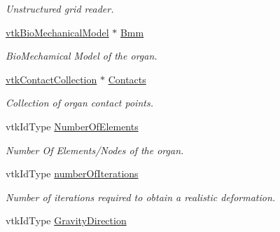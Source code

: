 \begin{DoxyCompactItemize}
\begin{DoxyCompactList}\small\item\em Unstructured grid reader. \item\end{DoxyCompactList}\item 
\hypertarget{classvtkOrgan_addaff1a7cdd0ab90c4a5de3ae53def26}{
\hyperlink{classvtkBioMechanicalModel}{vtkBioMechanicalModel} $\ast$ \hyperlink{classvtkOrgan_addaff1a7cdd0ab90c4a5de3ae53def26}{Bmm}}
\label{classvtkOrgan_addaff1a7cdd0ab90c4a5de3ae53def26}

\begin{DoxyCompactList}\small\item\em BioMechamical Model of the organ. \item\end{DoxyCompactList}\item 
\hypertarget{classvtkOrgan_a58b0a4343cff0509ac618c4544cfdb46}{
\hyperlink{classvtkContactCollection}{vtkContactCollection} $\ast$ \hyperlink{classvtkOrgan_a58b0a4343cff0509ac618c4544cfdb46}{Contacts}}
\label{classvtkOrgan_a58b0a4343cff0509ac618c4544cfdb46}

\begin{DoxyCompactList}\small\item\em Collection of organ contact points. \item\end{DoxyCompactList}\item 
\hypertarget{classvtkOrgan_af3c6805f5d942e3010031562ad68bb45}{
vtkIdType \hyperlink{classvtkOrgan_af3c6805f5d942e3010031562ad68bb45}{NumberOfElements}}
\label{classvtkOrgan_af3c6805f5d942e3010031562ad68bb45}

\begin{DoxyCompactList}\small\item\em Number Of Elements/Nodes of the organ. \item\end{DoxyCompactList}\item 
\hypertarget{classvtkOrgan_a9cf2eec29b5d474eacdd9f699bcebe94}{
vtkIdType \hyperlink{classvtkOrgan_a9cf2eec29b5d474eacdd9f699bcebe94}{numberOfIterations}}
\label{classvtkOrgan_a9cf2eec29b5d474eacdd9f699bcebe94}

\begin{DoxyCompactList}\small\item\em Number of iterations required to obtain a realistic deformation. \item\end{DoxyCompactList}\item 
\hypertarget{classvtkOrgan_a5dd255d4994f9557c1badd809d01afec}{
vtkIdType \hyperlink{classvtkOrgan_a5dd255d4994f9557c1badd809d01afec}{GravityDirection}}
\label{classvtkOrgan_a5dd255d4994f9557c1badd809d01afec}


\end{DoxyCompactItemize}
